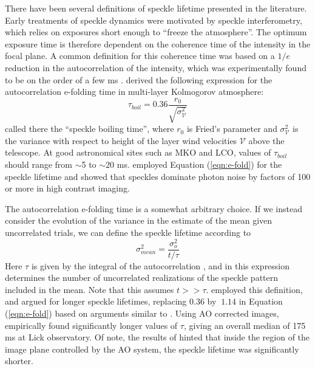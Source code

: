 \documentclass[11pt,preprint]{aastex}
\begin{document}
There have been several definitions of speckle lifetime presented in the literature.  Early treatments of speckle dynamics were motivated by speckle interferometry, which relies on exposures short enough to ``freeze the atmosphere''.  The optimum exposure time is therefore dependent on the coherence time of the intensity in the focal plane.  A common definition for this coherence time was based on a $1/e$ reduction in the autocorrelation of the intensity, which was experimentally found to be on the order of a few ms \citep{1978ApOpt..17.3779S,1990JMOp...37.1247D}.    \citet{1982JOpt...13..263R} derived the following expression for the autocorrelation e-folding time in multi-layer Kolmogorov atmosphere:
\begin{equation}
\tau_{boil} = 0.36 \frac{r_0}{\sqrt{\sigma^2_\mathcal{V}}}
\label{eqn:e-fold}
\end{equation}
called there the ``speckle boiling time'', where $r_0$ is Fried's parameter and $\sigma^2_\mathcal{V}$ is the variance with respect to height of the layer wind velocities $\mathcal{V}$  above the telescope.  At good astronomical sites such as MKO and LCO, values of $\tau_{boil}$ should range from $\sim$5 to $\sim$20 ms. \citet{1999PASP..111..587R} employed Equation (\ref{eqn:e-fold}) for the speckle lifetime and showed that speckles dominate photon noise by factors of 100 or more in high contrast imaging.

The autocorrelation e-folding time is a somewhat arbitrary choice.  If we instead consider the evolution of the variance in the estimate of the mean given uncorrelated trials, we can define the speckle lifetime according to
\begin{equation}
\sigma_{mean}^2 = \frac{\sigma_o^2}{t/\tau}
\label{eqn:varmean_def_intro}
\end{equation}
Here $\tau$ is given by the integral of the autocorrelation \citep{2006ApJ...637..541F}, and in this expression determines the number of uncorrelated realizations of the speckle pattern included in the mean.  Note that this assumes $t >> \tau$.  \citet{1986JOSAA...3.1001A} employed this definition, and argued for longer speckle lifetimes, replacing $0.36$ by $~$$1.14$ in Equation (\ref{eqn:e-fold}) based on arguments similar to \citet{1982JOpt...13..263R}.  Using AO corrected images, \citet{2006ApJ...637..541F} empirically found significantly longer values of $\tau$, giving an overall median of 175 ms at Lick observatory.  Of note, the results of \citet{2006ApJ...637..541F} hinted that inside the region of the image plane controlled by the AO system, the speckle lifetime was significantly shorter.
\end{document}
